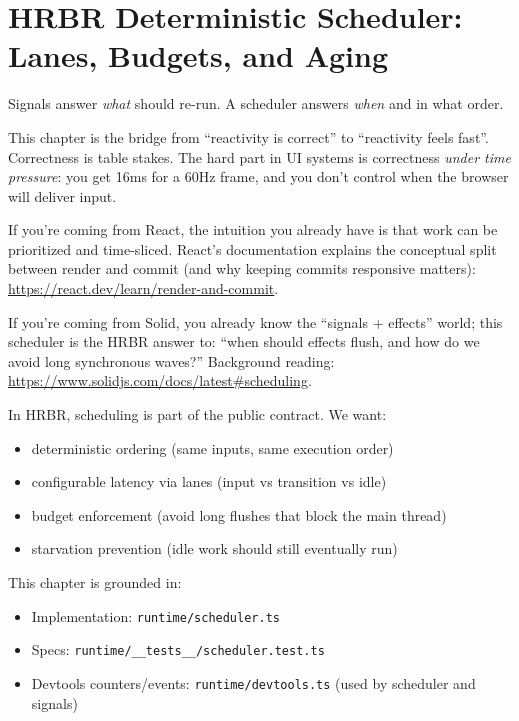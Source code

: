 \chapter{HRBR Deterministic Scheduler: Lanes, Budgets, and Aging}

Signals answer \emph{what} should re-run. A scheduler answers \emph{when} and in what order.

This chapter is the bridge from ``reactivity is correct'' to ``reactivity feels fast''.
Correctness is table stakes.
The hard part in UI systems is correctness \emph{under time pressure}: you get 16ms for a 60Hz frame, and you don't control when the browser will deliver input.

If you're coming from React, the intuition you already have is that work can be prioritized and time-sliced.
React's documentation explains the conceptual split between render and commit (and why keeping commits responsive matters):
\href{https://react.dev/learn/render-and-commit}{https://react.dev/learn/render-and-commit}.

If you're coming from Solid, you already know the ``signals + effects'' world; this scheduler is the HRBR answer to: ``when should effects flush, and how do we avoid long synchronous waves?''
Background reading: \href{https://www.solidjs.com/docs/latest#scheduling}{https://www.solidjs.com/docs/latest\#scheduling}.

In HRBR, scheduling is part of the public contract. We want:

\begin{itemize}
  \item deterministic ordering (same inputs, same execution order)
  \item configurable latency via lanes (input vs transition vs idle)
  \item budget enforcement (avoid long flushes that block the main thread)
  \item starvation prevention (idle work should still eventually run)
\end{itemize}

This chapter is grounded in:

\begin{itemize}
  \item Implementation: \texttt{runtime/scheduler.ts}
  \item Specs: \texttt{runtime/\_\_tests\_\_/scheduler.test.ts}
  \item Devtools counters/events: \texttt{runtime/devtools.ts} (used by scheduler and signals)
\end{itemize}

